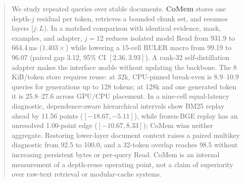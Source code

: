 \begin{abstract}
We study repeated queries over stable documents. \textbf{CoMem} stores one
depth-$j$ residual per token, retrieves a bounded chunk set, and resumes layers
$[j{:}L)$. In a matched comparison with identical evidence, mask, examples, and
adapter, $j{=}12$ reduces isolated model Read from 931.9 to 664.4\,ms
($1.403\times$) while lowering a 15-cell RULER macro from 99.19 to 96.07
(paired gap 3.12, 95\% CI $[2.36,3.93]$). A rank-32 self-distillation adapter
makes the interface usable without updating the backbone. The 8\,KiB/token
store requires reuse: at 32k, CPU-pinned break-even is 8.9--10.9 queries for
generations up to 128 tokens; at 128k and one generated token it is
25.8--27.6 across GPU/CPU placement. In a nine-cell equal-latency diagnostic,
dependence-aware hierarchical intervals show BM25 replay ahead by 11.56 points
($[-18.67,-5.11]$), while frozen-BGE replay has an unresolved 1.00-point edge
($[-10.67,8.33]$); CoMem wins neither aggregate. Restoring lower-layer document
context raises a paired multikey diagnostic from 92.5 to 100.0, and a 32-token
overlap reaches 98.5 without increasing persistent bytes or per-query Read.
CoMem is an internal measurement of a depth-reuse operating point, not a claim
of superiority over raw-text retrieval or modular-cache systems.
\end{abstract}
